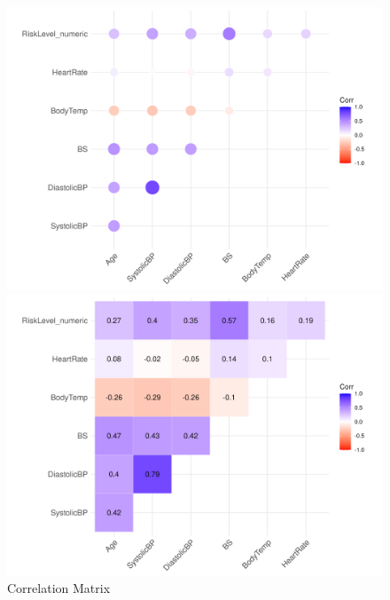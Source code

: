 \documentclass[
  letterpaper,
  DIV=11,
  numbers=noendperiod]{scrartcl}
\begin{document}
\begin{figure}

\begin{minipage}{0.50\linewidth}

\includegraphics{../outputs/images/correlation_matrix.png}

\end{minipage}%
%
\begin{minipage}{0.50\linewidth}

\includegraphics{../outputs/images/correlation_values.png}

\end{minipage}%

\caption{\label{fig-corr-mat}Correlation Matrix}

\end{figure}%
\end{document}
